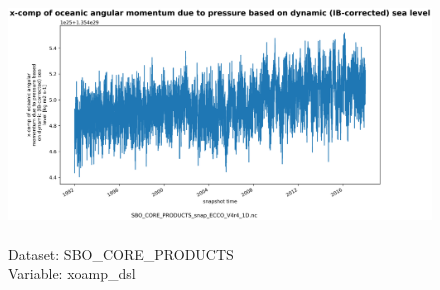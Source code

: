 \begin{figure}[H]
\centering
\includegraphics[scale=0.5]{../images/plots/oneD_plots/SBO_Core_Products/xoamp_dsl.png}
\caption{\\Dataset: SBO\_CORE\_PRODUCTS\\Variable: xoamp\_dsl}
\label{tab:table-SBO_CORE_PRODUCTS_xoamp_dsl-Plot}
\end{figure}
\pagebreak
